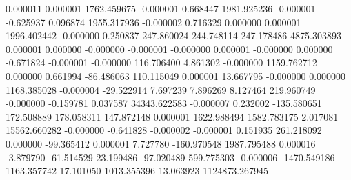                                 0.000011            0.000001         1762.459675           -0.000001            0.668447         1981.925236           -0.000001           -0.625937            0.096874         1955.317936           -0.000002            0.716329            0.000000            0.000001         1996.402442           -0.000000            0.250837          247.860024          244.748114          247.178486         4875.303893            0.000001            0.000000           -0.000000           -0.000001           -0.000000            0.000001           -0.000000            0.000000           -0.671824           -0.000001           -0.000000          116.706400            4.861302           -0.000000         1159.762712            0.000000            0.661994          -86.486063          110.115049            0.000001           13.667795           -0.000000            0.000000         1168.385028           -0.000004          -29.522914            7.697239            7.896269            8.127464          219.960749           -0.000000           -0.159781            0.037587        34343.622583           -0.000007            0.232002         -135.580651          172.508889          178.058311          147.872148            0.000001         1622.988494         1582.783175            2.017081        15562.660282           -0.000000           -0.641828           -0.000002           -0.000001            0.151935          261.218092            0.000000          -99.365412            0.000001            7.727780         -160.970548         1987.795488            0.000016           -3.879790          -61.514529           23.199486          -97.020489          599.775303           -0.000006        -1470.549186         1163.357742           17.101050         1013.355396           13.063923      1124873.267945